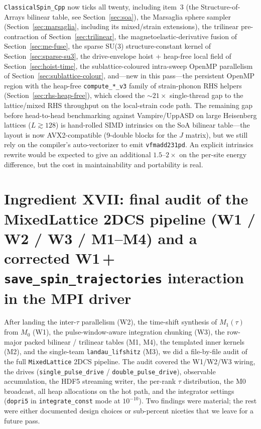 \documentclass[11pt,letterpaper]{article}
\begin{document}
\texttt{ClassicalSpin\_Cpp} now ticks all twenty, including
item~3 (the Structure-of-Arrays bilinear table, see
Section~\ref{sec:soa}), the Marsaglia sphere sampler
(Section~\ref{sec:marsaglia}, including its mixed/strain
extensions), the trilinear pre-contraction of
Section~\ref{sec:trilinear}, the magnetoelastic-derivative
fusion of Section~\ref{sec:me-fuse}, the sparse SU(3)
structure-constant kernel of Section~\ref{sec:sparse-su3}, the
drive-envelope hoist + heap-free local field of
Section~\ref{sec:hoist-time}, the sublattice-coloured intra-sweep
OpenMP parallelism of Section~\ref{sec:sublattice-colour},
and---new in this pass---the persistent OpenMP region with the
heap-free \texttt{compute\_*\_v3} family of strain-phonon RHS
helpers (Section~\ref{sec:rhs-heap-free}), which closed the
$\sim 21\times$ single-thread gap to the lattice/mixed RHS
throughput on the local-strain code path.  The remaining gap before
head-to-head benchmarking against Vampire/UppASD on large
Heisenberg lattices ($L \gtrsim 128$) is hand-rolled SIMD
intrinsics on the SoA bilinear table---the layout is now
AVX2-compatible (9-double blocks for the $J$ matrix), but we still
rely on the compiler's auto-vectorizer to emit
\texttt{vfmadd231pd}.  An explicit intrinsics rewrite would be
expected to give an additional $1.5$--$2 \times$ on the per-site
energy difference, but the cost in maintainability and portability
is real.

\section{Ingredient XVII: final audit of the MixedLattice 2DCS
         pipeline (W1 / W2 / W3 / M1--M4) and a corrected
         W1$\,$+$\,$\texttt{save\_spin\_trajectories} interaction
         in the MPI driver}
\label{sec:audit-mixed-2dcs}

After landing the inter-$\tau$ parallelism (W2), the time-shift
synthesis of $M_1(\tau)$ from $M_0$ (W1), the pulse-window-aware
integration chunking (W3), the row-major packed bilinear / trilinear
tables (M1, M4), the templated inner kernels (M2), and the
single-team \texttt{landau\_lifshitz} (M3), we did a
file-by-file audit of the full \texttt{MixedLattice} 2DCS pipeline.
The audit covered the W1/W2/W3 wiring, the drives
(\texttt{single\_pulse\_drive} / \texttt{double\_pulse\_drive}),
observable accumulation, the HDF5 streaming writer, the per-rank
$\tau$ distribution, the M0 broadcast, all heap allocations on the
hot path, and the integrator settings (\texttt{dopri5} in
\texttt{integrate\_const} mode at $10^{-10}$).  Two findings were
material; the rest were either documented design choices or
sub-percent niceties that we leave for a future pass.
\end{document}
